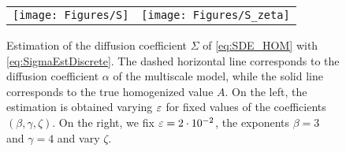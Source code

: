 \documentclass[10pt]{article}
\begin{document}
\begin{figure}
	\centering
	\begin{tabular}{cc}
		\texttt{[image: Figures/S]} & \texttt{[image: Figures/S\_zeta]}
	\end{tabular}
	\caption{Estimation of the diffusion coefficient $\Sigma$ of \eqref{eq:SDE_HOM} with \eqref{eq:SigmaEstDiscrete}. The dashed horizontal line corresponds to the diffusion coefficient $\alpha$ of the multiscale model, while the solid line corresponds to the true homogenized value $A$. On the left, the estimation is obtained varying $\varepsilon$ for fixed values of the coefficients $(\beta, \gamma, \zeta)$. On the right, we fix $\varepsilon = 2\cdot 10^{-2}$, the exponents $\beta = 3$ and $\gamma = 4$ and vary $\zeta$.}
	\label{fig:S}
\end{figure}
\end{document}
